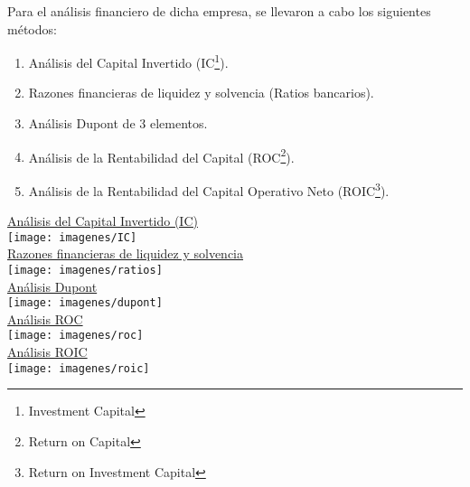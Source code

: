 Para el an\'alisis financiero de dicha empresa, se llevaron a cabo los siguientes m\'etodos:
\begin{enumerate}
\item An\'alisis del Capital Invertido (IC\footnote{Investment Capital}).
\item Razones financieras de liquidez y solvencia (Ratios bancarios).
\item An\'alisis Dupont de 3 elementos.
\item An\'alisis de la Rentabilidad del Capital (ROC\footnote{Return on Capital}).
\item An\'alisis de la Rentabilidad del Capital Operativo Neto (ROIC\footnote{Return on Investment Capital}).
\end{enumerate}
\newpage
\begin{center}
\underline{An\'alisis del Capital Invertido (IC)}\\[10pt]
\texttt{[image: imagenes/IC]}\\[10pt]

\underline{Razones financieras de liquidez y solvencia}\\[10pt]
\texttt{[image: imagenes/ratios]}\\[10pt]

\underline{An\'alisis Dupont}\\[10pt]
\texttt{[image: imagenes/dupont]}\\[10pt]

\underline{An\'alisis ROC}\\[10pt]
\texttt{[image: imagenes/roc]}\\[10pt]



\underline{An\'alisis ROIC}\\[10pt]
\texttt{[image: imagenes/roic]}\\[10pt]
\end{center}